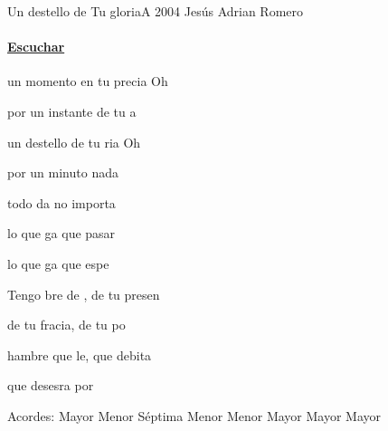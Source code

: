 \documentclass[12pt, spanish]{book}
\begin{document}
    \begin{song}{Un destello de Tu gloria}{A}
        {2004} %
        {Jesús Adrian  Romero}
        {} %
        {}
        \ifChordBk
        \paragraph{\mbox{}\hfill\protect\href{https://open.spotify.com/intl-es/track/1p857QcWbg695PflPkPYIE}{Escuchar}\mbox{}\hfill}
        \fi

        \begin{SBOpGroup}
             un momento en tu precia Oh 

            por un instante de tu a

             un destello de tu ria Oh 

            por un minuto nada 

            todo da no importa

            lo que ga que pasar

            lo que ga que espe
        \end{SBOpGroup}

        \begin{SBChorus}
            Tengo bre de , de tu presen

            de tu fracia, de tu po

            hambre que le, que debita

            que desesra por 
        \end{SBChorus}


        \ifChordBk
        \begin{SBOpGroup}
            Acordes:
             Mayor \hfill
             Menor S\'eptima \hfill\null\break
             Menor \hfill
             Menor \hfill\null\break
             Mayor \hfill
             Mayor \hfill\null\break
             Mayor \hfill\null\break
        \end{SBOpGroup}
        \fi


\end{song}
\end{document}
